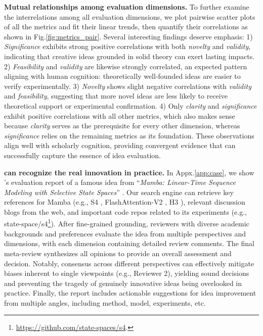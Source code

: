 \textbf{Mutual relationships among evaluation dimensions.}
To further examine the interrelations among all evaluation dimensions, we plot pairwise scatter plots of all the metrics and fit their linear trends, then quantify their correlations as shown in Fig.\ref{fig:metrics_pair}.
Several interesting findings deserve emphasis:
1) \textit{Significance} exhibits strong positive correlations with both \textit{novelty} and \textit{validity}, indicating that creative ideas grounded in solid theory can exert lasting impacts.
2) \textit{Feasibility} and \textit{validity} are likewise strongly correlated, an expected pattern aligning with human cognition: theoretically well-founded ideas are easier to verify experimentally.
3) \textit{Novelty} shows slight negative correlations with \textit{validity} and \textit{feasibility}, suggesting that more novel ideas are less likely to receive theoretical support or experimental confirmation.
4) Only \textit{clarity} and \textit{significance} exhibit positive correlations with all other metrics, which also makes sense because \textit{clarity} serves as the prerequisite for every other dimension, whereas \textit{significance} relies on the remaining metrics as its foundation.
These observations align well with scholarly cognition, providing convergent evidence that {\ours} can successfully capture the essence of idea evaluation.

\textbf{{\ours} can recognize the real innovation in practice.}
In Appx.\ref{app:case}, we show {\ours}'s evaluation report of a famous idea from ``\textit{Mamba: Linear-Time Sequence Modeling with Selective State Spaces}'' \cite{mamba}.
Our search engine can retrieve key references for Mamba (e.g., S4 \cite{s4}, FlashAttention-V2 \cite{flashattention}, H3 \cite{h3}), relevant discussion blogs from the web, and important code repos related to its experiments (e.g., state-space/s4\footnote{\url{https://github.com/state-spaces/s4}.}).
After fine-grained grounding, reviewers with diverse academic backgrounds and preferences evaluate the idea from multiple perspectives and dimensions, with each dimension containing detailed review comments.
The final meta-review synthesizes all opinions to provide an overall assessment and decision.
Notably, consensus across different perspectives can effectively mitigate biases inherent to single viewpoints (e.g., Reviewer 2), yielding sound decisions and preventing the tragedy of genuinely innovative ideas being overlooked in practice.
Finally, the report includes actionable suggestions for idea improvement from multiple angles, including method, model, experiments, etc.
